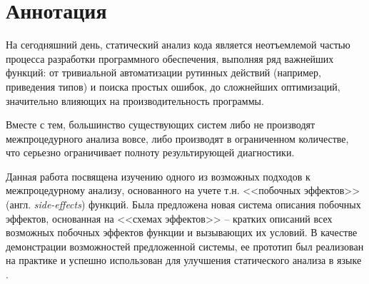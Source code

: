 \section*{Аннотация}

На сегодняшний день, статический анализ кода является неотъемлемой частью процесса разработки программного обеспечения, выполняя ряд важнейших функций: от тривиальной автоматизации рутинных действий (например, приведения типов) и поиска простых ошибок, до сложнейших оптимизаций, значительно влияющих на производительность программы. 

Вместе с тем, большинство существующих систем либо не производят межпроцедурного анализа вовсе, либо производят в ограниченном количестве, что серьезно ограничивает полноту результирующей диагностики.

Данная работа посвящена изучению одного из возможных подходов к межпроцедурному анализу, основанного на учете т.н. <<побочных эффектов>> (англ. \textit{side-effects}) функций. Была предложена новая система описания побочных эффектов, основанная на <<схемах эффектов>> -- кратких описаний всех возможных побочных эффектов функции и вызывающих их условий. В качестве демонстрации возможностей предложенной системы, ее прототип был реализован на практике и успешно использован для улучшения статического анализа в языке .